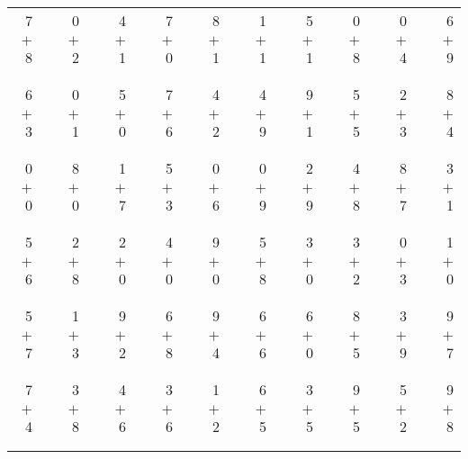 \documentclass[12pt, letterpaper]{article}
\begin{document}
\begin{tabular}{rrrrrrrrrrrrrrrrrrr}
7 & & 0 & & 4 & & 7 & & 8 & & 1 & & 5 & & 0 & & 0 & & 6\\
$+$ 8 & & $+$ 2 & & $+$ 1 & & $+$ 0 & & $+$ 1 & & $+$ 1 & & $+$ 1 & & $+$ 8 & & $+$ 4 & & $+$ 9\\
\cline{1-1} \cline{3-3} \cline{5-5} \cline{7-7} \cline{9-9} \cline{11-11} \cline{13-13} \cline{15-15} \cline{17-17} \cline{19-19} \\ \\
6 & & 0 & & 5 & & 7 & & 4 & & 4 & & 9 & & 5 & & 2 & & 8\\
$+$ 3 & & $+$ 1 & & $+$ 0 & & $+$ 6 & & $+$ 2 & & $+$ 9 & & $+$ 1 & & $+$ 5 & & $+$ 3 & & $+$ 4\\
\cline{1-1} \cline{3-3} \cline{5-5} \cline{7-7} \cline{9-9} \cline{11-11} \cline{13-13} \cline{15-15} \cline{17-17} \cline{19-19} \\ \\
0 & & 8 & & 1 & & 5 & & 0 & & 0 & & 2 & & 4 & & 8 & & 3\\
$+$ 0 & & $+$ 0 & & $+$ 7 & & $+$ 3 & & $+$ 6 & & $+$ 9 & & $+$ 9 & & $+$ 8 & & $+$ 7 & & $+$ 1\\
\cline{1-1} \cline{3-3} \cline{5-5} \cline{7-7} \cline{9-9} \cline{11-11} \cline{13-13} \cline{15-15} \cline{17-17} \cline{19-19} \\ \\
5 & & 2 & & 2 & & 4 & & 9 & & 5 & & 3 & & 3 & & 0 & & 1\\
$+$ 6 & & $+$ 8 & & $+$ 0 & & $+$ 0 & & $+$ 0 & & $+$ 8 & & $+$ 0 & & $+$ 2 & & $+$ 3 & & $+$ 0\\
\cline{1-1} \cline{3-3} \cline{5-5} \cline{7-7} \cline{9-9} \cline{11-11} \cline{13-13} \cline{15-15} \cline{17-17} \cline{19-19} \\ \\
5 & & 1 & & 9 & & 6 & & 9 & & 6 & & 6 & & 8 & & 3 & & 9\\
$+$ 7 & & $+$ 3 & & $+$ 2 & & $+$ 8 & & $+$ 4 & & $+$ 6 & & $+$ 0 & & $+$ 5 & & $+$ 9 & & $+$ 7\\
\cline{1-1} \cline{3-3} \cline{5-5} \cline{7-7} \cline{9-9} \cline{11-11} \cline{13-13} \cline{15-15} \cline{17-17} \cline{19-19} \\ \\
7 & & 3 & & 4 & & 3 & & 1 & & 6 & & 3 & & 9 & & 5 & & 9\\
$+$ 4 & & $+$ 8 & & $+$ 6 & & $+$ 6 & & $+$ 2 & & $+$ 5 & & $+$ 5 & & $+$ 5 & & $+$ 2 & & $+$ 8\\
\cline{1-1} \cline{3-3} \cline{5-5} \cline{7-7} \cline{9-9} \cline{11-11} \cline{13-13} \cline{15-15} \cline{17-17} \cline{19-19} \\ \\

\end{tabular}
\end{document}
